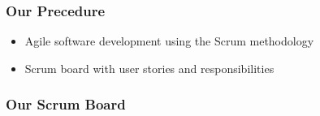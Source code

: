 \begin{frame}[t]
    \frametitle{Our Precedure}
    \begin{itemize}
   \item Agile software development using the Scrum methodology
   \item Scrum board with user stories and responsibilities
    \end{itemize}
    \begin{figure}
    	    \begin{center}
    	    \end{center}
    	\end{figure}
\end{frame}


\begin{frame}[t]
	\frametitle{Our Scrum Board}
    \begin{figure}
	    \begin{center}
	    \end{center}
	\end{figure}
\end{frame}
